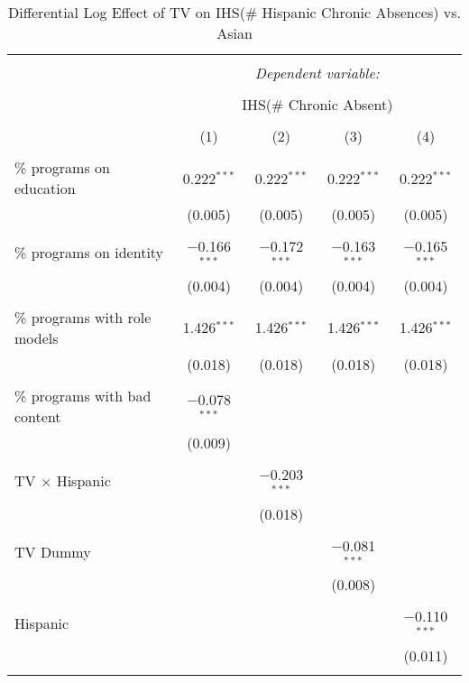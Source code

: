 
\begin{table}[!htbp] \centering 
  \caption{Differential Log Effect of TV on IHS(\# Hispanic Chronic Absences) vs. Asian} 
  \label{} 
\begin{tabular}{@{\extracolsep{-2pt}}lcccc} 
\\[-1.8ex]\hline 
\hline \\[-1.8ex] 
 & \multicolumn{4}{c}{\textit{Dependent variable:}} \\ 
\cline{2-5} 
\\[-1.8ex] & \multicolumn{4}{c}{IHS(\# Chronic Absent)} \\ 
\\[-1.8ex] & (1) & (2) & (3) & (4)\\ 
\hline \\[-1.8ex] 
 \% programs on education & 0.222$^{***}$ & 0.222$^{***}$ & 0.222$^{***}$ & 0.222$^{***}$ \\ 
  & (0.005) & (0.005) & (0.005) & (0.005) \\ 
  & & & & \\ 
 \% programs on identity & $-$0.166$^{***}$ & $-$0.172$^{***}$ & $-$0.163$^{***}$ & $-$0.165$^{***}$ \\ 
  & (0.004) & (0.004) & (0.004) & (0.004) \\ 
  & & & & \\ 
 \% programs with role models & 1.426$^{***}$ & 1.426$^{***}$ & 1.426$^{***}$ & 1.426$^{***}$ \\ 
  & (0.018) & (0.018) & (0.018) & (0.018) \\ 
  & & & & \\ 
 \% programs with bad content & $-$0.078$^{***}$ &  &  &  \\ 
  & (0.009) &  &  &  \\ 
  & & & & \\ 
 TV $\times$ Hispanic &  & $-$0.203$^{***}$ &  &  \\ 
  &  & (0.018) &  &  \\ 
  & & & & \\ 
 TV Dummy &  &  & $-$0.081$^{***}$ &  \\ 
  &  &  & (0.008) &  \\ 
  & & & & \\ 
 Hispanic &  &  &  & $-$0.110$^{***}$ \\ 
  &  &  &  & (0.011) \\ 
  & & & & \\ 

\end{tabular}
\end{table}
